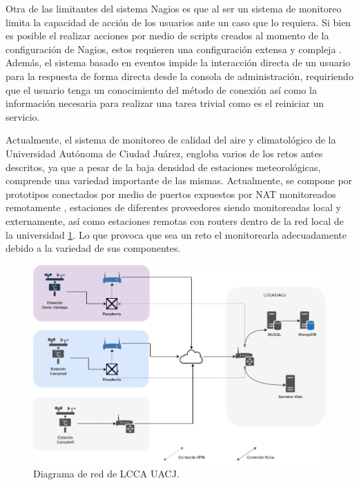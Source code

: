 Otra de las limitantes del sistema Nagios es que al ser un sistema de monitoreo limita la capacidad de acción de los usuarios ante un caso que lo requiera. Si bien es posible el realizar acciones por medio de scripts creados al momento de la configuración de Nagios, estos requieren una configuración extensa y compleja \cite{nagios_service_restart}. Además, el sistema basado en eventos impide la interacción directa de un usuario para la respuesta de forma directa desde la consola de administración, requiriendo que el usuario tenga un conocimiento del método de conexión así como la información necesaria para realizar una tarea trivial como es el reiniciar un servicio.



Actualmente, el sistema de monitoreo de calidad del aire y climatológico de la Universidad Autónoma de Ciudad Juárez, engloba varios de los retos antes descritos, ya que a pesar de la baja densidad de estaciones meteorológicas, comprende una variedad importante de las mismas. Actualmente, se compone por prototipos conectados por medio de puertos expuestos por NAT monitoreados remotamente \cite{red_climatologica_uacj}, estaciones de diferentes proveedores siendo monitoreadas local y externamente, así como estaciones remotas con routers dentro de la red local de la universidad \ref{fig:current_network}. Lo que provoca que sea un reto el monitorearla adecuadamente debido a la variedad de sus componentes.

\begin{figure}[!ht]
	\centering
	\includegraphics[width=.80\linewidth]{images/diagrams/current_network.png}
	\caption{Diagrama de red de LCCA UACJ.}
	\label{fig:current_network}
\end{figure}

